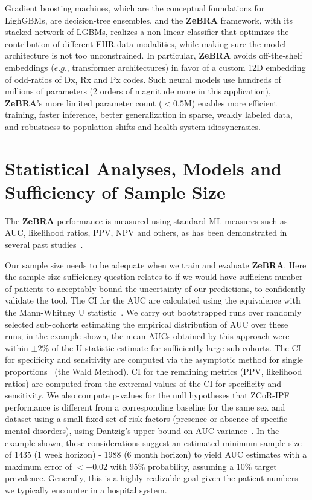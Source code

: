 \documentclass[onecolumn, compsoc,11pt]{IEEEtran}
\def\zebra{\textbf{ZeBRA}\xspace}
\def\zebra{\textbf{ZeBRA}\xspace}
\def\zcor{\zebra}
\def\pcor{ZCoR-IPF\xspace}
\begin{document}
Gradient boosting machines, which are the conceptual foundations for LighGBMs,  are decision-tree ensembles, and the \zcor framework, with its stacked network of LGBMs, realizes a non-linear classifier that optimizes the contribution of different EHR data modalities, while making sure the model architecture is not too unconstrained.  In particular, \zcor  avoids off-the-shelf embeddings ($e.g.$, transformer architectures) in favor of a custom 12D embedding of odd-ratios of Dx, Rx and Px codes. Such  neural models  use hundreds of millions of parameters (2 orders of magnitude more  in this application), \zcor’s more limited parameter count ($<0.5$M) enables  more efficient training, faster inference, better generalization in sparse, weakly labeled data, and robustness to population shifts and health system idiosyncrasies.




\section*{Statistical Analyses, Models and Sufficiency of Sample Size} The \zcor performance is measured using standard ML measures such as AUC, likelihood ratios, PPV, NPV and others, as has been demonstrated in several past studies~\cite{onishchenko2021reduced,onishchenko2022screening,JAHA2022}. 

Our sample size needs to be adequate when we train and evaluate \zcor . Here the sample size sufficiency question relates to if we would have sufficient number of patients to acceptably bound the uncertainty of our predictions, to confidently validate the tool. The CI for the  AUC are calculated using  the  equivalence with the Mann-Whitney U statistic~\cite{birnbaum1957bounds,mann1947test,wilcoxon1992individual}. We 
carry out bootstrapped runs over randomly selected sub-cohorts   estimating the empirical distribution of AUC over these runs; in the example shown, the mean AUCs obtained by this approach were within $\pm 2\%$ of the U statistic estimate for sufficiently large sub-cohorts. The CI for specificity and sensitivity are computed via  the asymptotic method for single proportions~\cite{newcombe1994confidence} (the Wald Method). CI for the remaining metrics (PPV, likelihood ratios) are computed from the extremal values of the CI for specificity and sensitivity. We also compute p-values for the null hypotheses that \pcor performance is different from a corresponding baseline for the same sex and dataset using a small fixed set of risk factors (presence or absence of specific mental disorders), using Dantzig's upper bound on AUC variance~\cite{birnbaum2020use,vandantzig1951consistency}.
 In the example shown, these considerations suggest an estimated minimum sample size 
 of  1435 (1 week horizon) -  1988 (6 month horizon) 
 to yield AUC estimates with a maximum error of $<\pm 0.02$ with 95\% probability, assuming a $10\%$ target prevalence. Generally, this is a highly realizable goal given the patient numbers we typically encounter in a hospital system.
\end{document}
